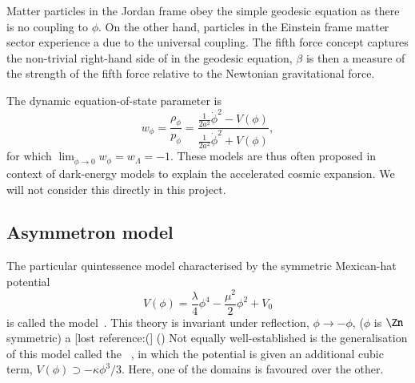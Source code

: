     Matter particles in the Jordan frame obey the simple geodesic equation as there is no coupling to $\phi$. On the other hand, particles in the Einstein frame matter sector experience a  due to the universal coupling. The fifth force concept captures the non-trivial right-hand side of in the geodesic equation,
    $\beta$ is then a measure of the strength of the fifth force relative to the Newtonian gravitational force.  



    The dynamic equation-of-state parameter is 
    \begin{equation}
        w_\phi =  \frac{\rho_\phi}{p_\phi}= \frac{\frac{1}{2a^2} \dot{\phi}^2 - V(\phi) }{\frac{1}{2a^2} \dot{\phi}^2 + V(\phi)},
    \end{equation}
    for which $\lim_{\dot{\phi}\to 0}{w_\phi}=w_\Lambda = -1$. %
    These models are thus often proposed in context of dark-energy models to explain the accelerated cosmic expansion. We will not consider this directly in this project.





    \subsection{Asymmetron model}\label{sec:cosmo:quintessence:asymmetron}
    The particular quintessence model characterised by the symmetric Mexican-hat potential
    \begin{equation}
        V(\phi) = \frac{\lambda}{4} \phi^4  - \frac{\mu^2}{2} \phi^2 + V_0
    \end{equation}
    is called the  model~\citep{hinterbichlerSymmetronCosmology2011}. This theory is invariant under reflection, $\phi\to -\phi$, ($\phi$ is $\Zn$ symmetric) a [lost reference:(] () %
    Not equally well-established is the generalisation of this model called the ~\citep{perivolaropoulosGravitationalTransitionsExplicitly2022}, in which the potential is given an additional cubic term, $V(\phi)\supset -\kappa\phi^3/3 $. Here, one of the domains is favoured over the other. 

